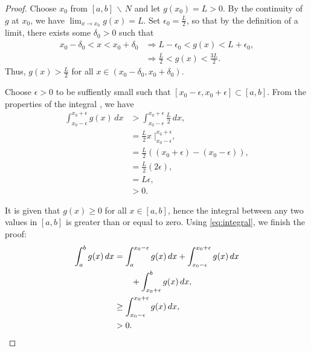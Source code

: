 \begin{enumerate}
\begin{enumerate}
\begin{enumerate}
\begin{proof}
                            Choose $x_0$ from $[a, b] \, \backslash \, N$ and let $g(x_0) = L > 0$.
                            By the continuity of $g$ at $x_0$, we have $\lim_{x \to x_0} g(x) = L$.
                            Set $\epsilon_0 = \frac{L}{2}$, so that by the definition of a limit, there exists some $\delta_0 > 0$ such that
                            \begin{align*}
                                x_0 - \delta_0 < x < x_0 + \delta_0 &\Longrightarrow L - \epsilon_0 < g(x) < L + \epsilon_0, \\
                                &\Longrightarrow \frac{L}{2} < g(x) < \frac{3 L}{2}.
                            \end{align*}
                            Thus, $g(x) > \frac{L}{2}$ for all $x \in (x_0 - \delta_0, x_0 + \delta_0)$.

                            Choose $\epsilon > 0$ to be suffiently small such that $[x_0 - \epsilon, x_0 + \epsilon] \subset [a, b]$.
                            From the properties of the integral \parencite{integral}, we have
                            \begin{align}
                                \int_{x_0 - \epsilon}^{x_0 + \epsilon} g(x) \, dx &> \int_{x_0 - \epsilon}^{x_0 + \epsilon} \frac{L}{2} \, dx, \nonumber \\
                                &= \frac{L}{2} x \; \big|_{x_0 - \epsilon}^{x_0 + \epsilon}, \nonumber \\
                                &= \frac{L}{2} \left((x_0 + \epsilon) - (x_0 - \epsilon)\right), \nonumber \\
                                &= \frac{L}{2} (2 \epsilon), \nonumber \\
                                &= L \epsilon, \nonumber \\
                                &> 0. \label{eq:integral}
                            \end{align}

                            It is given that $g(x) \ge 0$ for all $x \in [a, b]$, hence the integral between any two values in $[a, b]$ is greater than or equal to zero.
                            Using \cref{eq:integral}, we finish the proof:
                            \begin{align*}
                                \int_a^b g(x) \, dx &= \int_a^{x_0 - \epsilon} g(x) \, dx + \int_{x_0 - \epsilon}^{x_0 + \epsilon} g(x) \, dx \\
                                & \qquad + \int_{x_0 + \epsilon}^b g(x) \, dx, \\
                                &\ge \int_{x_0 - \epsilon}^{x_0 + \epsilon} g(x) \, dx, \\
                                &> 0. \qquad \qedhere
                            \end{align*}
                        \end{proof}


\end{enumerate}
\end{enumerate}
\end{enumerate}
